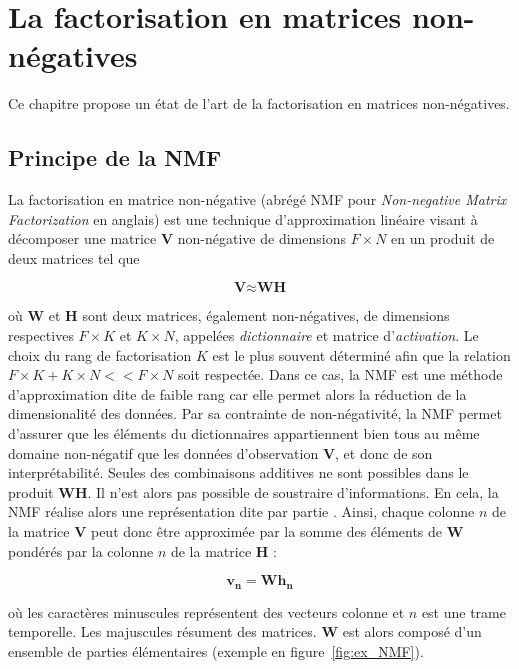%
%
%
%
%
\chapter{La factorisation en matrices non-négatives}
Ce chapitre propose un état de l'art de la factorisation en matrices non-négatives. 

\section{Principe de la NMF}
La factorisation en matrice non-négative (abrégé NMF pour \textit{Non-negative Matrix Factorization} en anglais) est une technique d'approximation linéaire visant à décomposer une matrice $\textbf{V}$ non-négative de dimensions $F \times N$ en un produit de deux matrices tel que

\begin{equation}
\textbf{V} \approx \textbf{WH}
\end{equation}

où $\textbf{W}$ et $\textbf{H}$ sont deux matrices, également non-négatives, de dimensions respectives $F \times K$ et $K \times N$, appelées \textit{dictionnaire} et matrice d'\textit{activation}. Le choix du rang de factorisation $K$ est le plus souvent déterminé afin que la relation $F \times K + K \times N << F \times N$ soit respectée. Dans ce cas, la NMF est une méthode d'approximation dite de faible rang car elle permet alors la réduction de la dimensionalité des données. Par sa contrainte de non-négativité, la NMF permet d'assurer que les éléments du dictionnaires appartiennent bien tous au même domaine non-négatif que les données d'observation $\mathbf{V}$, et donc de son interprétabilité. Seules des combinaisons additives ne sont possibles dans le produit $\mathbf{WH}$. Il n'est alors pas possible de soustraire d'informations. En cela, la NMF réalise alors une représentation dite \og par partie \fg{}. Ainsi, chaque colonne $n$ de la matrice $\mathbf{V}$ peut donc être approximée par la somme des éléments de $\mathbf{W}$ pondérés par la colonne $n$ de la matrice $\mathbf{H}$ : 

\begin{equation}
\mathbf{v_n} = \mathbf{Wh_n}
\end{equation}

où les caractères minuscules représentent des vecteurs colonne et $n$ est une trame temporelle. Les majuscules résument des matrices. $\mathbf{W}$ est alors composé d'un ensemble de parties élémentaires (exemple en figure~\ref{fig:ex_NMF}). 

